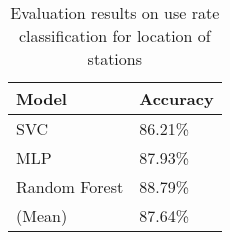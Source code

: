 \begin{table}[!htbp]
	\caption{Evaluation results on use rate classification for location of stations}
	\begin{center}
		\begin{tabular}{|l|l|}
			\hline
			Model & Accuracy\\
			\hline
			SVC & 86.21\%\\
			\hline
			MLP & 87.93\%\\
			\hline
			Random Forest & 88.79\%\\
			\hline
			(Mean) & 87.64\%\\
			\hline
		\end{tabular}
		\label{tab11}
	\end{center}
\end{table}